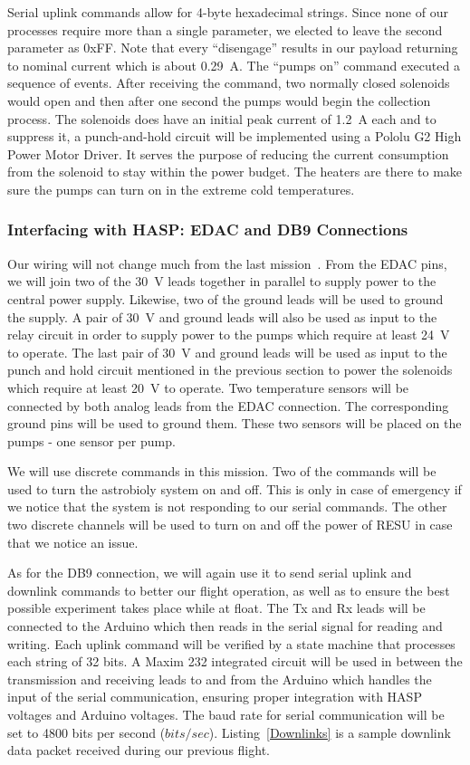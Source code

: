 Serial uplink commands allow for 4-byte hexadecimal strings.  Since none of our processes require more than a single parameter, we elected to leave the second parameter as 0xFF.  Note that every ``disengage'' results in our payload returning to nominal current which is about \SI{0.29}{\ampere}.  The ``pumps on'' command executed a sequence of events. After receiving the command, two normally closed solenoids would open and then after one second the pumps would begin the collection process.  The solenoids does have an initial peak current of \SI{1.2}{\ampere} each and to suppress it, a punch-and-hold circuit will be implemented using a Pololu G2 High Power Motor Driver.  It serves the purpose of reducing the current consumption from the solenoid to stay within the power budget.  The heaters are there to make sure the pumps can turn on in the extreme cold temperatures.  

\subsubsection{Interfacing with HASP: EDAC and DB9 Connections}

Our wiring will not change much from the last mission~\cite{SORA}.  From the EDAC pins, we will join two of the \SI{30}{\volt} leads together in parallel to supply power to the central power supply.  Likewise, two of the ground leads will be used to ground the supply.  A pair of \SI{30}{\volt} and ground leads will also be used as input to the relay circuit in order to supply power to the pumps which require at least \SI{24}{\volt} to operate.  The last pair of \SI{30}{\volt} and ground leads will be used as input to the punch and hold circuit mentioned in the previous section to power the solenoids which require at least \SI{20}{\volt} to operate.  Two temperature sensors will be connected by both analog leads from the EDAC connection.  The corresponding ground pins will be used to ground them.  These two sensors will be placed on the pumps - one sensor per pump.  

We will use discrete commands in this mission.  Two of the commands will be used to turn the astrobioly system on and off.  This is only in case of emergency if we notice that the system is not responding to our serial commands.  The other two discrete channels will be used to turn on and off the power of RESU in case that we notice an issue.

As for the DB9 connection, we will again use it to send serial uplink and downlink commands to better our flight operation, as well as to ensure the best possible experiment takes place while at float.  The Tx and Rx leads will be connected to the Arduino which then reads in the serial signal for reading and writing.  Each uplink command will be verified by a state machine that processes each string of \num{32} bits.  A Maxim 232 integrated circuit will be used in between the transmission and receiving leads to and from the Arduino which handles the input of the serial communication, ensuring proper integration with HASP voltages and Arduino voltages.  The baud rate for serial communication will be set to 4800 bits per second ($bits/sec$). Listing~\ref{Downlinks} is a sample downlink data packet received during our previous flight.

